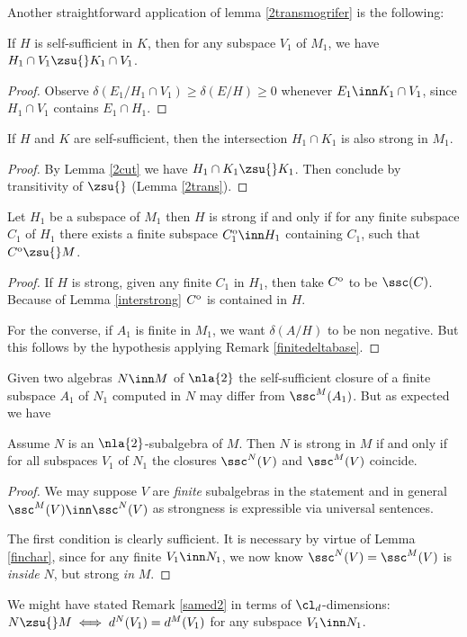 Another straightforward application of lemma \ref{2transmogrifer} is the following:
\begin{lem}\label{2cut}
If $H$ is self-sufficient in $K$, then for any subspace $V_{1}$ of $M_{1}$, we have
$H_{1}\cap V_{1}\zsu{} K_{1}\cap V_{1}$.
\end{lem}
\begin{proof}
Observe $\delta(E_{1}/H_{1}\cap V_{1})\geq\delta(E/H)\geq0$ whenever $E_{1}\inn K_{1}\cap V_{1}$, since
$H_{1}\cap V_{1}$ contains $E_{1}\cap H_{1}$.
\end{proof}
\begin{cor}\label{interstrong}
If $H$ and $K$ are self-sufficient,
then the intersection $H_{1}\cap K_{1}$ is also strong in $M_{1}$.
\end{cor}
\begin{proof}
By Lemma \ref{2cut} we have $H_{1}\cap K_{1}\zsu{} K_{1}$.
Then conclude by transitivity of $\zsu{}$ (Lemma \ref{2trans}).
\end{proof}


\begin{lem}\label{finchar}
Let $H_{1}$  be a subspace of $M_{1}$ then
$H$ is strong if and only if for any finite subspace $C_{1}$ of $H_{1}$ there exists a finite subspace
$C_{1}^{\rm o}\inn H_{1}$ containing $C_{1}$, such that $C^{\rm o}\zsu{}M$.
\end{lem}
\begin{proof}
If $H$ is strong, given any finite $C_{1}$ in $H_{1}$, then take $C^{\rm o}$ to be $\ssc(C)$.
Because of Lemma \ref{interstrong} $C^{\rm o}$ is contained in $H$.

\smallskip
For the converse, if $A_{1}$ is finite in $M_{1}$, we want $\delta(A/H)$ to be non negative.
But this follows by the hypothesis applying Remark \ref{finitedeltabase}.
\end{proof}

Given two algebras $N\inn M$ of $\nla{2}$ the self-sufficient
closure of a finite subspace $A_{1}$ of $N_{1}$ computed in $N$ may differ from $\ssc^{M}(A_{1})$.
But as expected we have
\begin{rem}\label{samed2}
Assume $N$ is an $\nla{2}$-subalgebra of $M$. Then $N$ is strong in $M$ if and only if for all subspaces
$V_{1}$ of $N_{1}$ the closures $\ssc^{N}(V)$ and $\ssc^{M}(V)$ %
coincide.
\end{rem}
\begin{proof}
We may suppose $V$ are {\em finite} subalgebras in the statement and in general $\ssc^{M}(V)\inn\ssc^{N}(V)$ as strongness
is expressible via universal sentences.

The first condition is clearly sufficient. It is necessary by virtue of Lemma \ref{finchar},
since for any finite $V_{1}\inn N_{1}$, we now know $\ssc^{N}(V)=\ssc^{M}(V)$ is {\em inside} $N$, but strong {\em in} $M$.
\end{proof}
We might have stated Remark \ref{samed2} in terms of $\cl_{d}$-dimensions: $N\zsu{}M\iff d^{N}(V_{1})=d^{M}(V_{1})$
for any subspace $V_{1}\inn N_{1}$.


